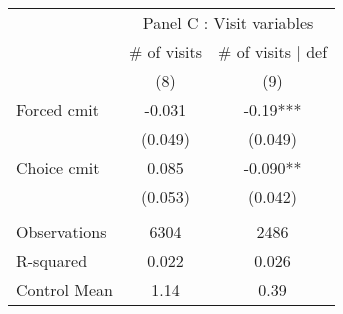 \begin{tabular}{lcc}
\toprule
      & \multicolumn{2}{c}{Panel C  : Visit variables} \\
\cmidrule{2-3}      & \# of visits & \# of visits $|$ def \\
\midrule
\midrule
      & (8)   & (9) \\
\midrule
\midrule
Forced cmit & -0.031 & -0.19*** \\
      & (0.049) & (0.049) \\
Choice cmit & 0.085 & -0.090** \\
      & (0.053) & (0.042) \\
      &       &  \\
\midrule
Observations & 6304  & 2486 \\
R-squared & 0.022 & 0.026 \\
Control Mean & 1.14  & 0.39 \\
\bottomrule
\bottomrule
\end{tabular}%
